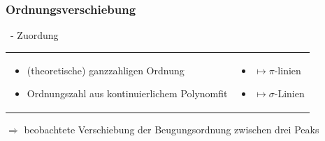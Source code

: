     \subsubsection{Ordnungsverschiebung}
      \begin{myframe}{\subsecname\ - \subsubsecname}
        Zuordung
        \begin{tabular}{p{}p{}}
          \begin{itemize}
            \item (theoretische) ganzzahligen Ordnung
            \item Ordnungszahl aus kontinuierlichem Polynomfit
          \end{itemize} &
          \begin{itemize}
            \item[] $\mapsto \pi$-linien
            \item[] $\mapsto \sigma$-Linien
          \end{itemize} \\
        \end{tabular}
        $\Rightarrow$ beobachtete Verschiebung der Beugungsordnung zwischen drei Peaks
      \end{myframe}
      
